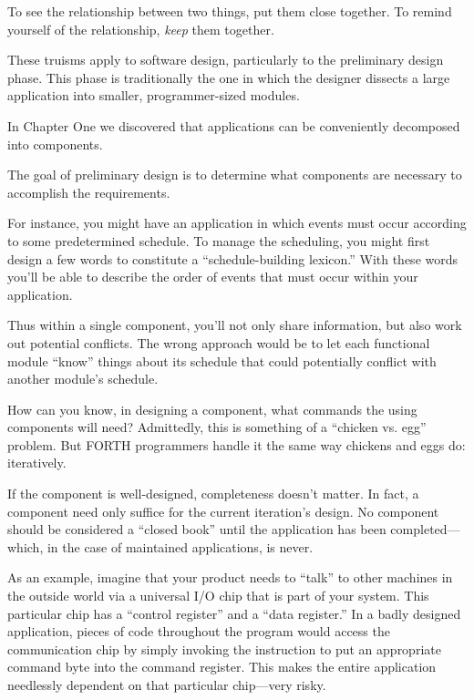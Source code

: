 \begin{tip}
To see the relationship between two things, put them close
together. To remind yourself of the relationship, \emph{keep} them
together.
\end{tip}

These truisms apply to software design, particularly to the preliminary
design phase. This phase is traditionally the one in which the designer
dissects a large application into smaller, programmer-sized modules.

In Chapter One\fixme{} we discovered that applications can be
conveniently decomposed into components.

\begin{tip}
The goal of preliminary design is to determine what components are
necessary to accomplish the requirements.
\end{tip}

For instance, you might have an application in which events must occur
according to some predetermined schedule. To manage the scheduling,
you might first design a few words to constitute a ``schedule-building
lexicon.'' With these words you'll be able to describe the order of events
that must occur within your application.

Thus within a single component, you'll not only share information,
but also work out potential conflicts. The wrong approach would be to let
each functional module ``know'' things about its schedule that could
potentially conflict with another module's schedule.

How can you know, in designing a component, what commands the
using components will need? Admittedly, this is something of a ``chicken
vs. egg'' problem. But FORTH programmers handle it the same way
chickens and eggs do: iteratively.

If the component is well-designed, completeness doesn't matter. In
fact, a component need only suffice for the current iteration's design. No
component should be considered a ``closed book'' until the application
has been completed---which, in the case of maintained applications, is
never.

As an example, imagine that your product needs to ``talk'' to other
machines in the outside world via a universal I/O chip that is part of your
system. This particular chip has a ``control register'' and a ``data
register.'' In a badly designed application, pieces of code throughout the
program would access the communication chip by simply invoking the
 instruction to put an appropriate command byte into the command
register. This makes the entire application needlessly dependent on that
particular chip---very risky.

